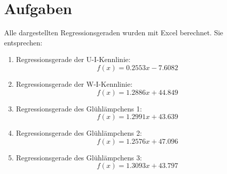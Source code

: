 \documentclass[12pt, a4paper, twoside]{article}
\begin{document}
    \section{Aufgaben}
    Alle dargestellten Regressionsgeraden wurden mit Excel berechnet. Sie entsprechen:
    \begin{enumerate}
        \item Regressionsgerade der U-I-Kennlinie: \[f(x) = 0.2553x - 7.6082\]
        \item Regressionsgerade der W-I-Kennlinie: \[f(x) = 1.2886x + 44.849\]
        \item Regressionsgerade des Glühlämpchens 1: \[f(x) = 1.2991x + 43.639\]
        \item Regressionsgerade des Glühlämpchens 2: \[f(x) = 1.2576x + 47.096\]
        \item Regressionsgerade des Glühlämpchens 3: \[f(x) = 1.3093x + 43.797\]
    \end{enumerate}
\end{document}
